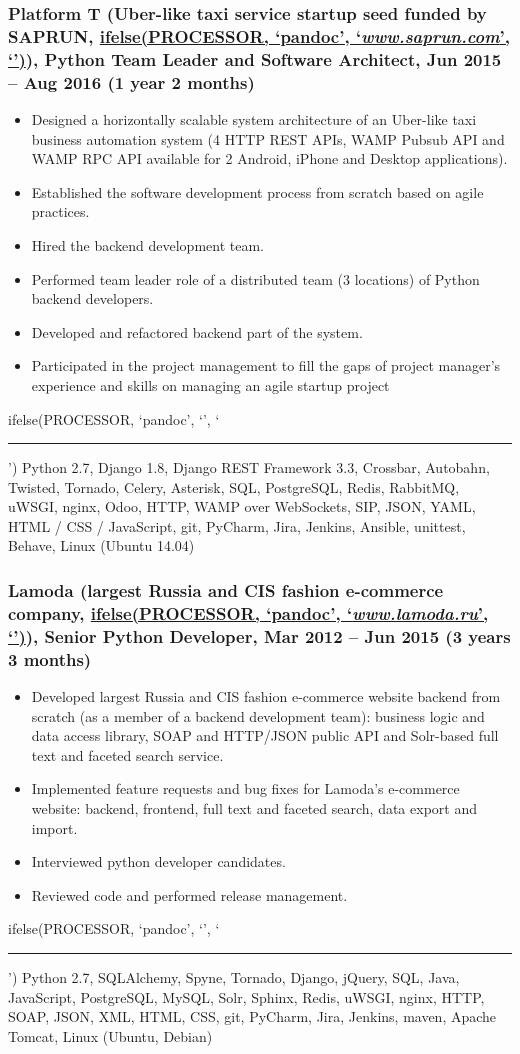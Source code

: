 \documentclass[a4paper,8pt]{extarticle}
\newcommand{\chref}[2]{\href{#1}
{ifelse(PROCESSOR, `pandoc', `#2', `\underline{\smash{#2}}')}}
\newcommand{\itchref}[2]{\chref{#1}{\textit{#2}}}  %
\newcommand{\chrule}{ifelse(PROCESSOR, `pandoc', `', `\vspace{3pt}\hrule')}
\begin{document}
\subsubsection*{Platform T (Uber-like taxi service startup seed funded by SAPRUN, \itchref{https://www.saprun.com}{www.saprun.com}), Python Team Leader and Software Architect, Jun 2015 – Aug 2016 (1 year 2 months)}
\begin{itemize}
    \item Designed a horizontally scalable system architecture of an Uber-like taxi business automation system (4 HTTP REST APIs, WAMP Pubsub API and WAMP RPC API available for 2 Android, iPhone and Desktop applications).
    \item Established the software development process from scratch based on agile practices.
    \item Hired the backend development team.
    \item Performed team leader role of a distributed team (3 locations) of Python backend developers.
    \item Developed and refactored backend part of the system.
    \item Participated in the project management to fill the gaps of project manager's experience and skills on managing an agile startup project
\end{itemize}
\chrule
Python 2.7, Django 1.8, Django REST Framework 3.3, Crossbar, Autobahn, Twisted, Tornado, Celery, Asterisk, SQL, PostgreSQL, Redis, RabbitMQ, uWSGI, nginx, Odoo, HTTP, WAMP over WebSockets, SIP, JSON, YAML, HTML / CSS / JavaScript, git, PyCharm, Jira, Jenkins, Ansible, unittest, Behave, Linux (Ubuntu 14.04)

\subsubsection*{Lamoda (largest Russia and CIS fashion e-commerce company, \itchref{https://www.lamoda.ru}{www.lamoda.ru}), Senior Python Developer, Mar 2012 – Jun 2015 (3 years 3 months)}
\begin{itemize}
    \item Developed largest Russia and CIS fashion e-commerce website backend from scratch (as a member of a backend development team): business logic and data access library, SOAP and HTTP/JSON public API and Solr-based full text and faceted search service.
    \item Implemented feature requests and bug fixes for Lamoda's e-commerce website: backend, frontend, full text and faceted search, data export and import.
    \item Interviewed python developer candidates.
    \item Reviewed code and performed release management.
\end{itemize}
\chrule
Python 2.7, SQLAlchemy, Spyne, Tornado, Django, jQuery, SQL, Java, JavaScript, PostgreSQL, MySQL, Solr, Sphinx, Redis, uWSGI, nginx, HTTP, SOAP, JSON, XML, HTML, CSS, git, PyCharm, Jira, Jenkins, maven, Apache Tomcat, Linux (Ubuntu, Debian)
\end{document}

